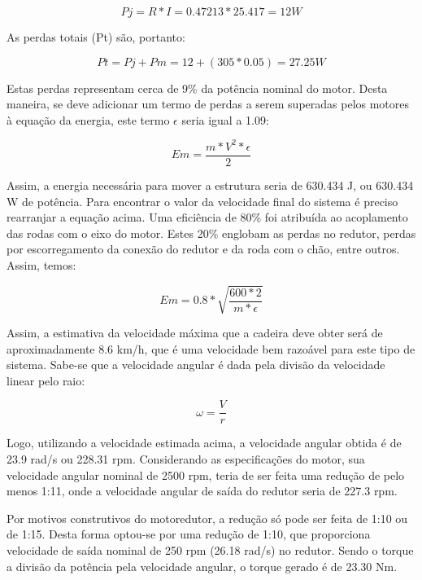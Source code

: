   \begin{equation}
  Pj = R*I = 0.47213*25.417 = 12 W
  \end{equation}

  As perdas totais (Pt) são, portanto:

  \begin{equation}
  Pt = Pj+Pm = 12+(305*0.05) = 27.25 W
  \end{equation}

  Estas perdas representam cerca de 9\% da potência nominal do motor. Desta maneira, se deve adicionar um termo de perdas a serem superadas pelos motores à equação da energia, este termo $\epsilon$ seria igual a 1.09:

  \begin{equation}
    Em = \frac{m*V^2*\epsilon}{2}
  \end{equation}

  Assim, a energia necessária para mover a estrutura seria de 630.434 J, ou 630.434 W de potência. Para encontrar o valor da velocidade final do sistema é preciso rearranjar a equação acima. Uma eficiência de 80\% foi atribuída ao acoplamento das rodas com o eixo do motor. Estes 20\% englobam as perdas no redutor, perdas por escorregamento da conexão do redutor e da roda com o chão, entre outros. Assim, temos:

  \begin{equation}
  Em = 0.8*\sqrt{\frac{600*2}{m*\epsilon}}
  \end{equation}

  Assim, a estimativa da velocidade máxima que a cadeira deve obter será de aproximadamente 8.6 km/h, que é uma velocidade bem razoável para este tipo de sistema. Sabe-se que a velocidade angular é dada pela divisão da velocidade linear pelo raio:

  \begin{equation}
  \omega = \frac{V}{r}
  \end{equation}

  Logo, utilizando a velocidade estimada acima, a velocidade angular obtida é de 23.9 rad/s ou 228.31 rpm. Considerando as especificações do motor, sua velocidade angular nominal de 2500 rpm, teria de ser feita uma redução de pelo menos 1:11, onde a velocidade angular de saída do redutor seria de 227.3 rpm.

  Por motivos construtivos do motoredutor, a redução só pode ser feita de 1:10 ou de 1:15. Desta forma optou-se por uma redução de 1:10, que proporciona velocidade de saída nominal de 250 rpm (26.18 rad/s) no redutor. Sendo o torque a divisão da potência pela velocidade angular, o torque gerado é de 23.30 Nm.

